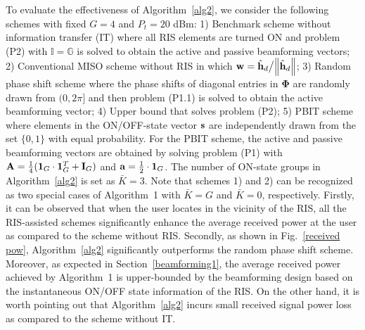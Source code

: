 \documentclass[draftclsnofoot,onecolumn,12pt]{IEEEtran}
\newcommand{\rev}[1]{{\color{red}#1}} %
\newcommand{\revh}[1]{{\color{black}#1}} %
\newcommand{\rev}[1]{#1}
\newcommand{\revh}[1]{#1}
\begin{document}
To evaluate the effectiveness of Algorithm~\ref{alg2}, we consider the following schemes with fixed $G=4$ and $P_t=20$ dBm: 1) Benchmark scheme without information transfer (IT) \cite{Wu2018Intelligent} where all RIS elements are turned ON and problem (P2) with $\mathbb{I}=\mathbb{G}$ is solved to obtain the active and passive beamforming vectors; 2) Conventional MISO scheme without RIS in which ${\bf w}= {\hat{\bf h}_d}{\big /}{\left\| \hat{\bf h}_d \right\|}$; 3) Random phase shift scheme where the phase shifts of diagonal entries in $\bm \Phi$ are randomly drawn from $(0,2 \pi ]$ and then problem (P1.1) is solved to obtain the active beamforming vector; 4) Upper bound that solves problem (P2); \revh{5) PBIT scheme where elements in the ON/OFF-state vector $\bf s$ are independently drawn from the set $\{0,1\}$ with equal probability. 
For the PBIT scheme, the active and passive beamforming vectors are obtained by solving problem (P1) with ${\bf A}=\frac{1}{4}({\bf 1}_G\cdot{\bf 1}_G^T+{\bf I}_G)$ and ${\bf a}=\frac{1}{2}\cdot {\bf 1}_G$. The number of ON-state groups in Algorithm~\ref{alg2} is set as ${\bar K}=3$.} 
Note that schemes 1) and 2) can be recognized as two special cases of Algorithm~1 with ${\bar K}=G$ and ${\bar K}=0$, respectively. 
Firstly, it can be observed that when the user locates in the vicinity of the RIS, all the RIS-assisted schemes significantly enhance the average received power at the user as compared to the scheme without RIS. 
Secondly, as shown in Fig.~\ref{received pow}, Algorithm~\ref{alg2} significantly outperforms the random phase shift scheme. 
Moreover, as expected in Section~\ref{beamforming1}, the average received  power achieved by Algorithm~1 is upper-bounded by the beamforming design based on the instantaneous ON/OFF state information of the RIS.  
On the other hand, it is worth pointing out that Algorithm~\ref{alg2} incurs small received signal power loss as compared to the scheme without IT. 
\end{document}
